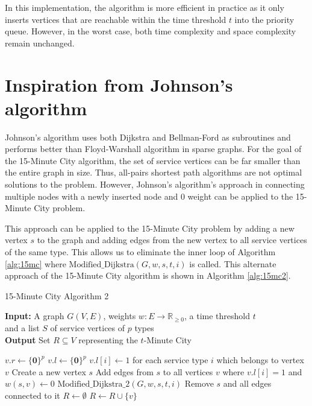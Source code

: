In this implementation, the algorithm is more efficient in practice as it only inserts vertices that are reachable within the time threshold $t$ into the priority queue. However, in the worst case, both time complexity and space complexity remain unchanged.

\section{Inspiration from Johnson's algorithm}

Johnson's algorithm uses both Dijkstra and Bellman-Ford as subroutines and performs better than Floyd-Warshall algorithm in sparse graphs. For the goal of the 15-Minute City algorithm, the set of service vertices can be far smaller than the entire graph in size. Thus, all-pairs shortest path algorithms are not optimal solutions to the problem. However, Johnson's algorithm's approach in connecting multiple nodes with a newly inserted node and $0$ weight can be applied to the 15-Minute City problem.

This approach can be applied to the 15-Minute City problem by adding a new vertex $s$ to the graph and adding edges from the new vertex to all service vertices of the same type. This allows us to eliminate the inner loop of Algorithm \ref{alg:15mc} where $\text{Modified\_Dijkstra}(G, w, s, t, i)$ is called. This alternate approach of the 15-Minute City algorithm is shown in Algorithm \ref{alg:15mc2}.

\begin{algorithm}[H]
    \caption{15-Minute City Algorithm 2} \label{alg:15mc2}
    \textbf{Input:} A graph $G(V,E)$, weights $w:E\rightarrow\mathbb{R}_{\geq 0}$, a time threshold $t$ \\  and a list $S$ of service vertices of $p$ types\\
    \textbf{Output} Set $R\subseteq V$ representing the $t$-Minute City
    \begin{algorithmic}
            \State $v.r \gets \{\mathbf{0}\}^{p}$
            \State $v.l \gets \{\mathbf{0}\}^{p}$
        \EndFor
            \State $v.l[i] \gets 1$ for each service type $i$ which belongs to vertex $v$
        \EndFor
            \State Create a new vertex $s$
            \State Add edges from $s$ to all vertices $v$ where $v.l[i]=1$ and $w(s,v) \gets 0$
            \State $\text{Modified\_Dijkstra\_2}(G,w,s,t,i)$
            \State Remove $s$ and all edges connected to it
        \EndFor
        \State $R\gets\emptyset$
                \State $R \gets R\cup \{v\}$
            \EndIf
        \EndFor
    \end{algorithmic}
\end{algorithm}

